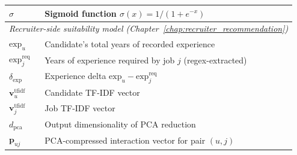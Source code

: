 \begin{longtable}{@{}ll@{}}
    $\sigma$                       & Sigmoid function $\sigma(x) = 1/(1+e^{-x})$ \\
    \midrule
    \multicolumn{2}{l}{\textit{Recruiter-side suitability model
        (Chapter~\ref{chap:recruiter_recommendation})}} \\
    \midrule
    $\text{exp}_u$                 & Candidate's total years of recorded experience \\
    $\text{exp}_j^{\text{req}}$    & Years of experience required by job $j$ (regex-extracted) \\
    $\delta_{\text{exp}}$          & Experience delta $\text{exp}_u - \text{exp}_j^{\text{req}}$ \\
    $\mathbf{v}_u^{\text{tfidf}}$ & Candidate TF-IDF vector \\ 
    $\mathbf{v}_j^{\text{tfidf}}$ & Job TF-IDF vector \\
    $d_{\text{pca}}$               & Output dimensionality of PCA reduction \\
    $\mathbf{p}_{uj}$ & PCA-compressed interaction vector for pair $(u,j)$ \\


\end{longtable}
